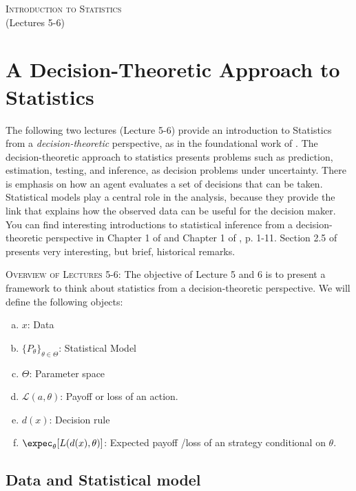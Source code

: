\documentclass[11pt]{article} %
\begin{document}
\onehalfspace

\vspace*{\fill}
\begingroup
\centering

\Large {\scshape Introduction to Statistics}\\

(Lectures 5-6)

\endgroup
\vspace*{\fill}

\newpage

\section{A Decision-Theoretic Approach to Statistics}
The following two lectures (Lecture 5-6) provide an introduction to Statistics from a \emph{decision-theoretic} perspective, as in the foundational work of \cite{Wald50}. The decision-theoretic approach to statistics presents problems such as prediction, estimation, testing, and inference, as decision problems under uncertainty. There is emphasis on how an agent evaluates a set of decisions that can be taken. Statistical models play a central role in the analysis, because they provide the link that explains how the observed data can be useful for the decision maker. You can find interesting introductions to  statistical inference from a decision-theoretic perspective in Chapter 1 of \cite{Lehman05} and Chapter 1 of \cite{Ferguson67}, p. 1-11. Section 2.5 of \cite{leCam2000} presents very interesting, but brief, historical remarks.

{\scshape Overview of Lectures 5-6:} The objective of Lecture 5 and 6 is to present a framework to think about statistics from a decision-theoretic perspective.  We will define the following objects:


\begin{enumerate}[a)]
\item $x$: Data
\item $\{P_{\theta}\}_{\theta \in \Theta}$: Statistical Model
\item $\Theta$: Parameter space
\item $\mathcal{L}(a,\theta)$: Payoff or loss  of an action.
\item $d(x)$: Decision rule
\item $\expec_{\theta}[L(d(x),\theta)]$: Expected payoff /loss of an strategy conditional on $\theta$.
\end{enumerate}

\subsection{Data and Statistical model}
\end{document}
